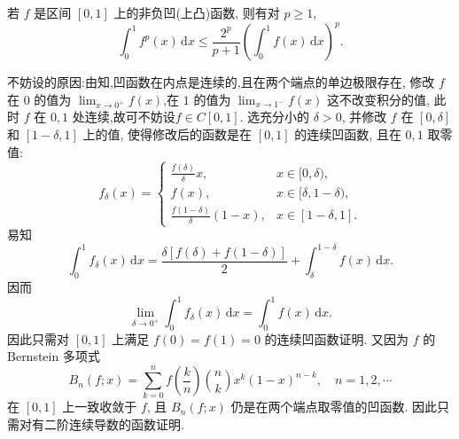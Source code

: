 \documentclass[../../main.tex]{subfiles}%
\begin{document}
\begin{theorem}[Favard不等式]\label{theorem:Favard(法瓦尔)不等式}
若 \( f \) 是区间 \([0,1]\) 上的非负凹(上凸)函数, 则有对 \( p \geqslant 1 \),
\[
\int_{0}^{1} f^p(x) \, \mathrm{d}x \leqslant \frac{2^p}{p + 1} \left( \int_{0}^{1} f(x) \, \mathrm{d}x \right)^p.
\]
\end{theorem}
\begin{remark}
不妨设的原因:由知,凹函数在内点是连续的,且在两个端点的单边极限存在, 修改 \( f \) 在 \( 0 \) 的值为 \( \lim_{x \to 0^+} f(x) \),在 \( 1\) 的值为 \( \lim_{x \to 1^-} f(x) \) 这不改变积分的值, 此时 \( f \) 在 \( 0,1 \) 处连续,故可不妨设$f\in C[0,1]$. 选充分小的 \( \delta > 0 \), 并修改 \( f \) 在 \([0,\delta]\) 和 \([1 - \delta,1]\) 上的值, 使得修改后的函数是在 \([0,1]\) 的连续凹函数, 且在 \( 0,1 \) 取零值:
\[
f_{\delta}(x) = \begin{cases} 
\frac{f(\delta)}{\delta} x, & x \in [0,\delta), \\
f(x), & x \in [\delta,1 - \delta), \\
\frac{f(1 - \delta)}{\delta} (1 - x), & x \in [1 - \delta,1].
\end{cases}
\]
易知
\[
\int_{0}^{1} f_{\delta}(x) \, \mathrm{d}x = \frac{\delta [f(\delta) + f(1 - \delta)]}{2} + \int_{\delta}^{1 - \delta} f(x) \, \mathrm{d}x.
\]
因而
\[
\lim_{\delta \to 0^+} \int_{0}^{1} f_{\delta}(x) \, \mathrm{d}x = \int_{0}^{1} f(x) \, \mathrm{d}x.
\]
因此只需对 \([0,1]\) 上满足 \( f(0) = f(1) = 0 \) 的连续凹函数证明. 又因为 \( f \) 的 Bernstein 多项式
\[
B_n(f; x) = \sum_{k=0}^{n} f\left( \frac{k}{n} \right) \binom{n}{k} x^k (1 - x)^{n - k}, \quad n = 1,2,\cdots
\]
在 \([0,1]\) 上一致收敛于 \( f \), 且 \( B_n(f; x) \) 仍是在两个端点取零值的凹函数. 因此只需对有二阶连续导数的函数证明. 
\end{remark}
\end{document}
